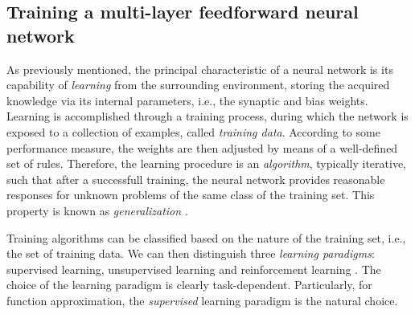 \documentclass[longtitle]{elsarticle}
\numberwithin{equation}{section}
\theoremstyle{theorem}
\theoremstyle{definition}
\theoremstyle{remark}
\theoremstyle{proposition}
\numberwithin{figure}{section}
\begin{document}
		
	
	\subsection{Training a multi-layer feedforward neural network}
	\label{section:Training a multi-layer feedforward neural network}
	
		As previously mentioned, the principal characteristic of a neural network is its capability of \emph{learning} from the surrounding environment, storing the acquired knowledge via its internal parameters, i.e., the synaptic and bias weights. Learning is accomplished through a training process, during which the network is exposed to a collection of examples, called \emph{training data}. According to some performance measure, the weights are then adjusted by means of a well-defined set of rules. Therefore, the learning procedure is an \emph{algorithm}, typically iterative, such that after a successfull training, the neural network provides reasonable responses for unknown problems of the same class of the training set. This property is known as \emph{generalization} \cite{Kri07}. 
		
		Training algorithms can be classified based on the nature of the training set, i.e., the set of training data. We can then distinguish three \emph{learning paradigms}: supervised learning, unsupervised learning and reinforcement learning \cite{Hag96}. The choice of the learning paradigm is clearly task-dependent. Particularly, for function approximation, the \emph{supervised} learning paradigm is the natural choice. 
		
\end{document}
